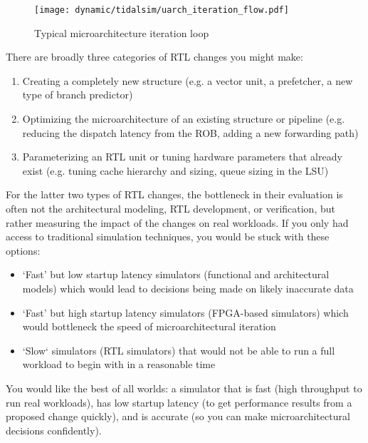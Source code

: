 \documentclass[sigplan,nonacm,10pt]{acmart}
\begin{document}
\begin{figure}
  \texttt{[image: dynamic/tidalsim/uarch\_iteration\_flow.pdf]}
  \caption{Typical microarchitecture iteration loop}
  \label{fig:uarch_iteration_loop}
\end{figure}

There are broadly three categories of RTL changes you might make:
\begin{enumerate}
  \item Creating a completely new structure (e.g. a vector unit, a prefetcher, a new type of branch predictor)
  \item Optimizing the microarchitecture of an existing structure or pipeline (e.g. reducing the dispatch latency from the ROB, adding a new forwarding path)
  \item Parameterizing an RTL unit or tuning hardware parameters that already exist (e.g. tuning cache hierarchy and sizing, queue sizing in the LSU)
\end{enumerate}

For the latter two types of RTL changes, the bottleneck in their evaluation is often not the architectural modeling, RTL development, or verification, but rather measuring the impact of the changes on real workloads.
If you only had access to traditional simulation techniques, you would be stuck with these options:
\begin{itemize}
  \item `Fast' but low startup latency simulators (functional and architectural models) which would lead to decisions being made on likely inaccurate data
  \item `Fast' but high startup latency simulators (FPGA-based simulators) which would bottleneck the speed of microarchitectural iteration
  \item `Slow` simulators (RTL simulators) that would not be able to run a full workload to begin with in a reasonable time
\end{itemize}

You would like the best of all worlds: a simulator that is fast (high throughput to run real workloads), has low startup latency (to get performance results from a proposed change quickly), and is accurate (so you can make microarchitectural decisions confidently).
\end{document}
